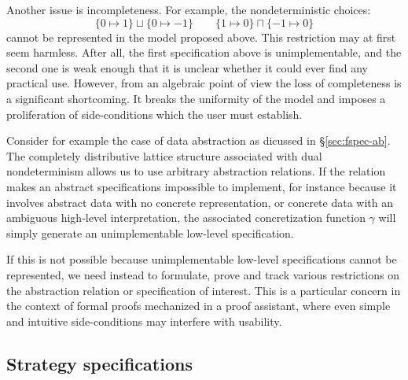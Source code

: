 \documentclass[11pt,oneside,draft]{book}
\theoremstyle{definition}
\begin{document}
Another issue is incompleteness.
For example, the nondeterministic choices:
\[
  \{ 0 \mapsto 1 \} \sqcup \{ 0 \mapsto -1 \}
  \qquad
  \{ 1 \mapsto 0 \} \sqcap \{ -1 \mapsto 0 \}
\]
cannot be represented in the model proposed above.
This restriction may at first seem harmless.
After all,
the first specification above is unimplementable,
and the second one is weak enough
that it is unclear whether
it could ever find any practical use.
However,
from an algebraic point of view
the loss of completeness is a significant shortcoming.
It breaks the uniformity of the model
and imposes a proliferation of side-conditions
which the user must establish.

Consider for example
the case of data abstraction as dicussed in \S\ref{sec:fspec-ab}.
The completely distributive lattice structure
associated with dual nondeterminism
allows us to use arbitrary abstraction relations.
If the relation makes an abstract specifications
impossible to implement,
for instance because it involves abstract data
with no concrete representation,
or concrete data with an ambiguous high-level interpretation,
the associated concretization function $\gamma$
will simply generate an unimplementable
low-level specification.

If this is not possible because
unimplementable low-level specifications cannot be represented,
we need instead to formulate, prove and track various restrictions
on the abstraction relation or specification of interest.
This is a particular concern in the context of
formal proofs mechanized in a proof assistant,
where even simple and intuitive side-conditions
may interfere with usability.


\subsection{Strategy specifications} \label{sec:strategyspec} %
\end{document}
